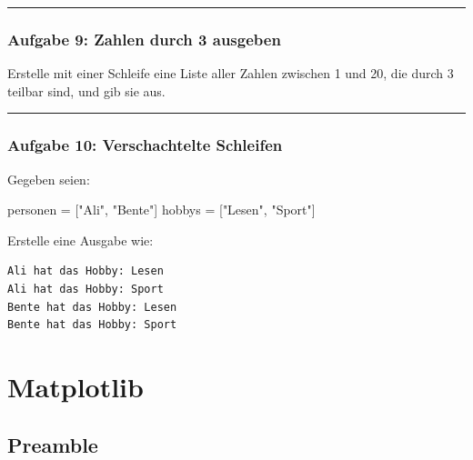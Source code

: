 \documentclass[
  letterpaper,
  DIV=11,
  numbers=noendperiod]{scrreprt}
\newenvironment{Shaded}{\begin{snugshade}}{\end{snugshade}}
\newcommand{\NormalTok}[1]{\textcolor[rgb]{0.00,0.23,0.31}{#1}}
\newcommand{\OperatorTok}[1]{\textcolor[rgb]{0.37,0.37,0.37}{#1}}
\newcommand{\StringTok}[1]{\textcolor[rgb]{0.13,0.47,0.30}{#1}}
\begin{document}
\begin{center}\rule{0.5\linewidth}{0.5pt}\end{center}

\section{Aufgabe 9: Zahlen durch 3
ausgeben}\label{aufgabe-9-zahlen-durch-3-ausgeben}

Erstelle mit einer Schleife eine Liste aller Zahlen zwischen 1 und 20,
die durch 3 teilbar sind, und gib sie aus.

\begin{center}\rule{0.5\linewidth}{0.5pt}\end{center}

\section{Aufgabe 10: Verschachtelte
Schleifen}\label{aufgabe-10-verschachtelte-schleifen}

Gegeben seien:

\begin{Shaded}
\begin{Highlighting}[]
\NormalTok{personen }\OperatorTok{=}\NormalTok{ [}\StringTok{"Ali"}\NormalTok{, }\StringTok{"Bente"}\NormalTok{]}
\NormalTok{hobbys }\OperatorTok{=}\NormalTok{ [}\StringTok{"Lesen"}\NormalTok{, }\StringTok{"Sport"}\NormalTok{]}
\end{Highlighting}
\end{Shaded}

Erstelle eine Ausgabe wie:

\begin{verbatim}
Ali hat das Hobby: Lesen
Ali hat das Hobby: Sport
Bente hat das Hobby: Lesen
Bente hat das Hobby: Sport
\end{verbatim}

\part{Matplotlib}

\chapter*{Preamble}\label{preamble}

\end{document}
